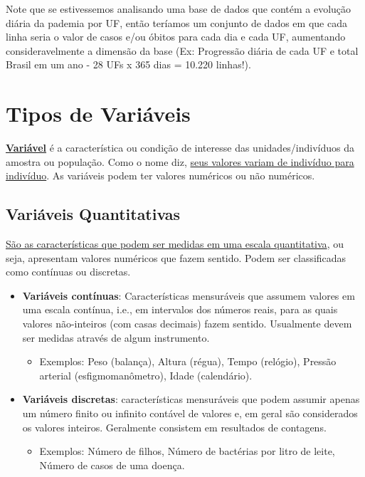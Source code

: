 \documentclass[
]{book}
\providecommand{\tightlist}{%
  \setlength{\itemsep}{0pt}\setlength{\parskip}{0pt}}
\begin{document}
Note que se estivessemos analisando uma base de dados que contém a evolução diária da pademia por UF, então teríamos um conjunto de dados em que cada linha seria o valor de casos e/ou óbitos para cada dia e cada UF, aumentando consideravelmente a dimensão da base (Ex: Progressão diária de cada UF e total Brasil em um ano - 28 UFs x 365 dias = 10.220 linhas!).

\hypertarget{tipos-de-variuxe1veis}{%
\section{Tipos de Variáveis}\label{tipos-de-variuxe1veis}}

\uline{\textbf{Variável}} é a característica ou condição de interesse das unidades/indivíduos da amostra ou população. Como o nome diz, \uline{seus valores variam de indivíduo para indivíduo}. As variáveis podem ter valores numéricos ou não numéricos.

\hypertarget{variuxe1veis-quantitativas}{%
\subsection{Variáveis Quantitativas}\label{variuxe1veis-quantitativas}}

\uline{São as características que podem ser medidas em uma escala quantitativa}, ou seja, apresentam valores numéricos que fazem sentido. Podem ser classificadas como contínuas ou discretas.

\begin{itemize}
\item
  \textbf{Variáveis contínuas}: Características mensuráveis que assumem valores em uma escala contínua, i.e., em intervalos dos números reais, para as quais valores não-inteiros (com casas decimais) fazem sentido. Usualmente devem ser medidas através de algum instrumento.

  \begin{itemize}
  \tightlist
  \item
    Exemplos: Peso (balança), Altura (régua), Tempo (relógio), Pressão arterial (esfigmomanômetro), Idade (calendário).
  \end{itemize}
\item
  \textbf{Variáveis discretas}: características mensuráveis que podem assumir apenas um número finito ou infinito contável de valores e, em geral são considerados os valores inteiros. Geralmente consistem em resultados de contagens.

  \begin{itemize}
  \tightlist
  \item
    Exemplos: Número de filhos, Número de bactérias por litro de leite, Número de casos de uma doença.
  \end{itemize}
\end{itemize}
\end{document}
